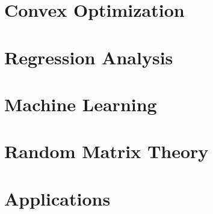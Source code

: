 \documentclass[12pt]{prettybook}
\begin{document}
\part{Convex Optimization}




\part{Regression Analysis}



\part{Machine Learning}




\part{Random Matrix Theory}

\part{Applications}


\appendix

\backmatter
\nocite{*}
\printbibliography
\end{document}
